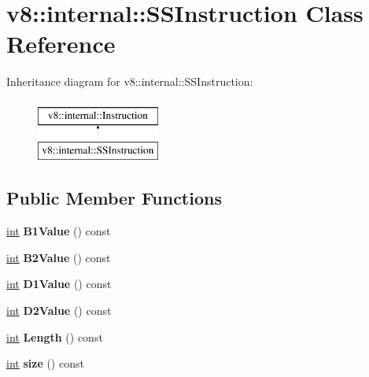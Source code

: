 \hypertarget{classv8_1_1internal_1_1SSInstruction}{}\section{v8\+:\+:internal\+:\+:S\+S\+Instruction Class Reference}
\label{classv8_1_1internal_1_1SSInstruction}
Inheritance diagram for v8\+:\+:internal\+:\+:S\+S\+Instruction\+:\begin{figure}[H]
\begin{center}
\leavevmode
\includegraphics[height=2.000000cm]{classv8_1_1internal_1_1SSInstruction}
\end{center}
\end{figure}
\subsection*{Public Member Functions}
\begin{DoxyCompactItemize}
\item 
\mbox{\label{classv8_1_1internal_1_1SSInstruction_ac39352f4d10ce07a84e3feb58dc829ee}} 
\mbox{\hyperlink{classint}{int}} {\bfseries B1\+Value} () const
\item 
\mbox{\label{classv8_1_1internal_1_1SSInstruction_a750d3d7833863b90a4ce2b51400ec6fb}} 
\mbox{\hyperlink{classint}{int}} {\bfseries B2\+Value} () const
\item 
\mbox{\label{classv8_1_1internal_1_1SSInstruction_ae56ecc570de5fa89909efe17c686bb98}} 
\mbox{\hyperlink{classint}{int}} {\bfseries D1\+Value} () const
\item 
\mbox{\label{classv8_1_1internal_1_1SSInstruction_a7c31c65767f458ade9869830a3d4f90f}} 
\mbox{\hyperlink{classint}{int}} {\bfseries D2\+Value} () const
\item 
\mbox{\label{classv8_1_1internal_1_1SSInstruction_aa8ba55ac7531e140a49128c39a2f454b}} 
\mbox{\hyperlink{classint}{int}} {\bfseries Length} () const
\item 
\mbox{\label{classv8_1_1internal_1_1SSInstruction_af1b9b269af3dc3738ffa506b70be5faa}} 
\mbox{\hyperlink{classint}{int}} {\bfseries size} () const
\end{DoxyCompactItemize}


